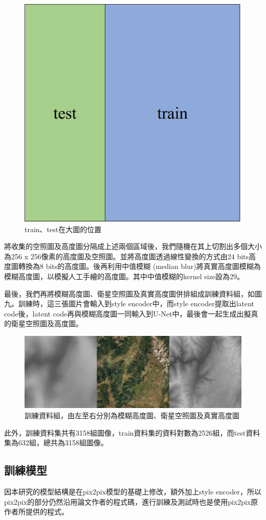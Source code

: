 \documentclass[a4paper, 12pt]{article}
\begin{document}
\begin{figure}[H]
    \centering
    \includegraphics[width=0.3\linewidth]{fig/9.jpg}
    \caption{train、test在大圖的位置}
    \label{fig:9}
\end{figure}

將收集的空照圖及高度圖分隔成上述兩個區域後，我們隨機在其上切割出多個大小為256 x 256像素的高度圖及空照圖。並將高度圖透過線性變換的方式由24 bits高度圖轉換為8 bits的高度圖。後再利用中值模糊 (median blur)將真實高度圖模糊為模糊高度圖，以模擬人工手繪的高度圖。其中中值模糊的kernel size設為29。

最後，我們再將模糊高度圖、衛星空照圖及真實高度圖併排組成訓練資料組，如圖九。訓練時，這三張圖片會輸入到style encoder中，而style encoder提取出latent code後，latent code再與模糊高度圖一同輸入到U-Net中，最後會一起生成出擬真的衛星空照圖及高度圖。

\begin{figure}[H]
    \centering
    \includegraphics[width=\linewidth]{fig/10.jpg}
    \caption{訓練資料組，由左至右分別為模糊高度圖、衛星空照圖及真實高度圖}
    \label{fig:10}
\end{figure}

此外，訓練資料集共有3158組圖像，train資料集的資料對數為2526組，而test資料集為632組，總共為3158組圖像。

\subsection{訓練模型}
因本研究的模型結構是在pix2pix模型的基礎上修改，額外加上style encoder，所以pix2pix的部分仍然沿用論文作者的程式碼，進行訓練及測試時也是使用pix2pix原作者所提供的程式。
\end{document}
